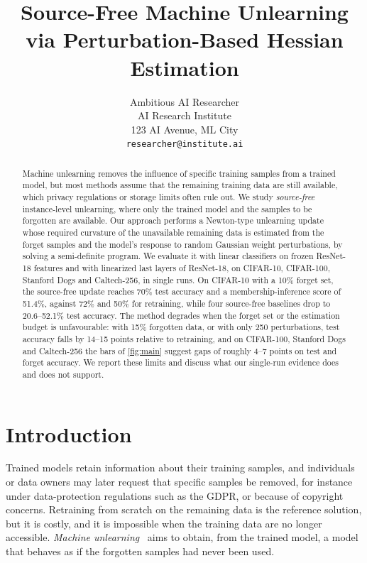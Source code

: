 \documentclass[10pt,twocolumn,letterpaper]{article}
\title{Source-Free Machine Unlearning via Perturbation-Based Hessian Estimation}
\author{Ambitious AI Researcher\\
AI Research Institute\\
123 AI Avenue, ML City\\
{\tt\small researcher@institute.ai}
}
\begin{document}
\maketitle

\begin{abstract}
Machine unlearning removes the influence of specific training samples from a trained model, but most methods assume that the remaining training data are still available, which privacy regulations or storage limits often rule out.
We study \emph{source-free} instance-level unlearning, where only the trained model and the samples to be forgotten are available.
Our approach performs a Newton-type unlearning update whose required curvature of the unavailable remaining data is estimated from the forget samples and the model's response to random Gaussian weight perturbations, by solving a semi-definite program.
We evaluate it with linear classifiers on frozen ResNet-18 features and with linearized last layers of ResNet-18, on CIFAR-10, CIFAR-100, Stanford Dogs and Caltech-256, in single runs.
On CIFAR-10 with a 10\% forget set, the source-free update reaches 70\% test accuracy and a membership-inference score of 51.4\%, against 72\% and 50\% for retraining, while four source-free baselines drop to 20.6--52.1\% test accuracy.
The method degrades when the forget set or the estimation budget is unfavourable: with 15\% forgotten data, or with only 250 perturbations, test accuracy falls by 14--15 points relative to retraining, and on CIFAR-100, Stanford Dogs and Caltech-256 the bars of \cref{fig:main} suggest gaps of roughly 4--7 points on test and forget accuracy.
We report these limits and discuss what our single-run evidence does and does not support.
\end{abstract}

\section{Introduction}
\label{sec:intro}
Trained models retain information about their training samples, and individuals or data owners may later request that specific samples be removed, for instance under data-protection regulations such as the GDPR, or because of copyright concerns.
Retraining from scratch on the remaining data is the reference solution, but it is costly, and it is impossible when the training data are no longer accessible.
\emph{Machine unlearning}~\cite{cao2015towards,bourtoule2021machine,xu2023machine} aims to obtain, from the trained model, a model that behaves as if the forgotten samples had never been used.
\end{document}

